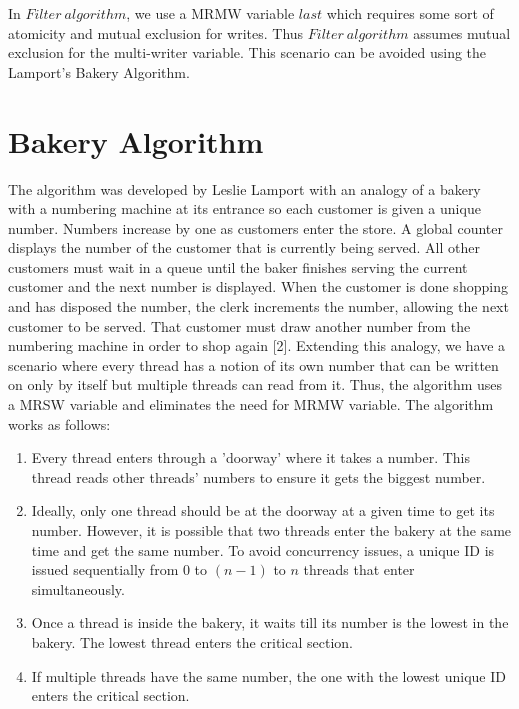 \documentclass[twoside]{article}
\renewcommand{\cite}[1]{[#1]}
\begin{document}
In $Filter\ algorithm$, we use a MRMW variable $last$ which requires some sort of atomicity and mutual exclusion for writes. Thus $Filter\ algorithm$ assumes mutual exclusion for the multi-writer variable.
This scenario can be avoided using the Lamport's Bakery Algorithm.



\section{Bakery Algorithm}
The algorithm was developed by Leslie Lamport with an analogy of a bakery with a numbering machine at its entrance so each customer is given a unique number. Numbers increase by one as customers enter the store. A global counter displays the number of the customer that is currently being served. All other customers must wait in a queue until the baker finishes serving the current customer and the next number is displayed. When the customer is done shopping and has disposed the number, the clerk increments the number, allowing the next customer to be served. That customer must draw another number from the numbering machine in order to shop again \cite{2}.
Extending this analogy, we have a scenario where every thread has a notion of its own number that can be written on only by itself but multiple threads can read from it. Thus, the algorithm uses a MRSW variable and eliminates the need for MRMW variable. The algorithm works as follows:

\begin{enumerate}
    \itemsep0em
    \item Every thread enters through a 'doorway' where it takes a number. This thread reads other threads' numbers to ensure it gets the biggest number.
    \item Ideally, only one thread should be at the doorway at a given time to get its number. However, it is possible that two threads enter the bakery at the same time and get the same number. To avoid concurrency issues, a unique ID is issued sequentially from 0 to $(n-1)$ to $n$ threads that enter simultaneously.
    \item Once a thread is inside the bakery, it waits till its number is the lowest in the bakery. The lowest thread enters the critical section.
    \item If multiple threads have the same number, the one with the lowest unique ID enters the critical section.
\end{enumerate}
\end{document}
